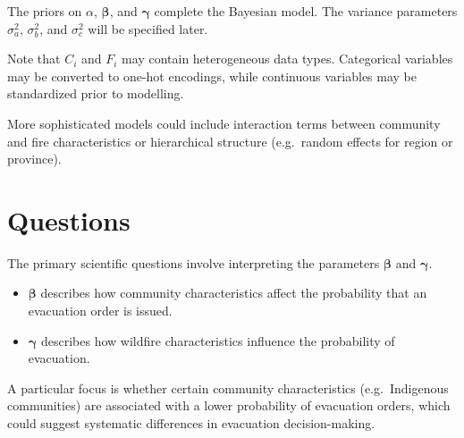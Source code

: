 \documentclass[11pt]{article}
\begin{document}
The priors on $\alpha$, $\boldsymbol{\beta}$, and $\boldsymbol{\gamma}$ complete the Bayesian model. The variance parameters $\sigma_a^2$, $\sigma_b^2$, and $\sigma_c^2$ will be specified later.

Note that $C_i$ and $F_i$ may contain heterogeneous data types. Categorical variables may be converted to one-hot encodings, while continuous variables may be standardized prior to modelling.

More sophisticated models could include interaction terms between community and fire characteristics or hierarchical structure (e.g.\ random effects for region or province).

\section{Questions}

The primary scientific questions involve interpreting the parameters $\boldsymbol{\beta}$ and $\boldsymbol{\gamma}$.

\begin{itemize}
\item $\boldsymbol{\beta}$ describes how community characteristics affect the probability that an evacuation order is issued.
\item $\boldsymbol{\gamma}$ describes how wildfire characteristics influence the probability of evacuation.
\end{itemize}

A particular focus is whether certain community characteristics (e.g.\ Indigenous communities) are associated with a lower probability of evacuation orders, which could suggest systematic differences in evacuation decision-making.
\end{document}
